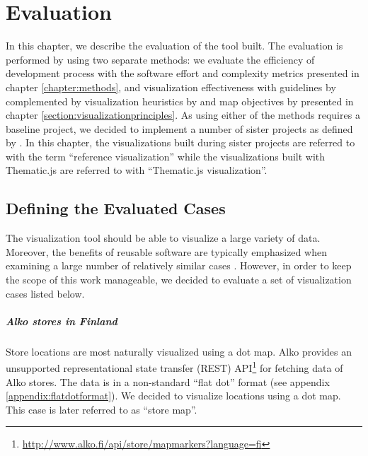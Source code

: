 
\chapter{Evaluation}
\label{chapter:evaluation}

In this chapter, we describe the evaluation of the tool built. The evaluation is performed by using two separate methods: we evaluate the efficiency of development process with the software effort and complexity metrics presented in chapter \ref{chapter:methods}, and visualization effectiveness with guidelines by \citet{kraak_cartographic_1998} complemented by visualization heuristics by \citet{zuk_heuristics_2006} and map objectives by \citet{schlichtmann_visualization_2002} presented in chapter \ref{section:visualizationprinciples}. As using either of the methods requires a baseline project, we decided to implement a number of sister projects as defined by \citet{kitchenham_evaluating_1998}. In this chapter, the visualizations built during sister projects are referred to with the term ``reference visualization'' while the visualizations built with Thematic.js are referred to with ``Thematic.js visualization''. 

\section{Defining the Evaluated Cases}

The visualization tool should be able to visualize a large variety of data. Moreover, the benefits of reusable software are typically emphasized when examining a large number of relatively similar cases \citep{frakes_software_1996}. However, in order to keep the scope of this work manageable, we decided to evaluate a set of visualization cases listed below.

\paragraph{Alko stores in Finland}
Store locations are most naturally visualized using a dot map. Alko provides an unsupported representational state transfer (REST) API\footnote{\url{http://www.alko.fi/api/store/mapmarkers?language=fi}} for fetching data of Alko stores. The data is in a non-standard ``flat dot'' format (see appendix \ref{appendix:flatdotformat}). We decided to visualize locations using a dot map. This case is later referred to as ``store map''.

